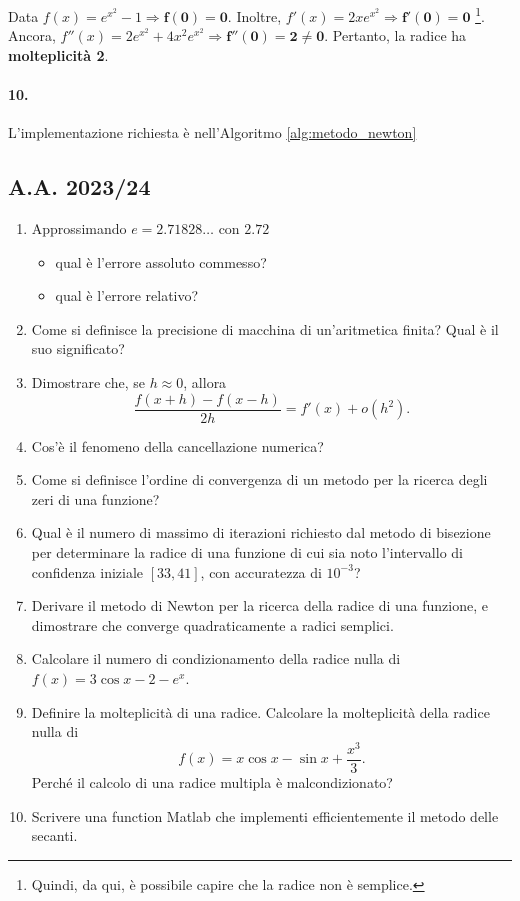\noindent Data $f(x)=e^{x^2}-1\Rightarrow\boldsymbol{f(0)=0}$. Inoltre, $f'(x)=2xe^{x^2}\Rightarrow\boldsymbol{f'(0)=0}$ \footnote{Quindi, da qui, è possibile capire che la radice non è semplice.}. Ancora, $f''(x)=2e^{x^2}+4x^2e^{x^2}\Rightarrow\boldsymbol{f''(0)=2\neq 0}.$ Pertanto, la radice ha \textbf{molteplicità 2}.

\paragraph{10.} L'implementazione richiesta è nell'Algoritmo \ref{alg:metodo_newton}

\subsection{A.A. 2023/24}
\begin{enumerate}
	\item Approssimando $e=2.71828\hdots$ con $2.72$
	\begin{itemize}
		\item qual è l'errore assoluto commesso?
		\item qual è l'errore relativo?
	\end{itemize}
	\item Come si definisce la precisione di macchina di un'aritmetica finita? Qual è il suo significato?
	\item Dimostrare che, se $h\approx 0$, allora
	\begin{equation*}
		\frac{f(x+h)-f(x-h)}{2h}=f'(x)+o(h^2).
	\end{equation*}
	\item Cos'è il fenomeno della cancellazione numerica?
	\item Come si definisce l'ordine di convergenza di un metodo per la ricerca degli zeri di una funzione?
	\item Qual è il numero di massimo di iterazioni richiesto dal metodo di bisezione per determinare la radice di una funzione di cui sia noto l'intervallo di confidenza iniziale $[33,41]$, con accuratezza di $10^{-3}$?
	\item Derivare il metodo di Newton per la ricerca della radice di una funzione, e dimostrare che converge quadraticamente a radici semplici.
	\item Calcolare il numero di condizionamento della radice nulla di $f(x)=3\cos x-2-e^x$.
	\item Definire la molteplicità di una radice. Calcolare la molteplicità della radice nulla di
	\begin{equation*}
		f(x)=x\cos x - \sin x + \frac{x^3}{3}.
	\end{equation*}
	Perché il calcolo di una radice multipla è malcondizionato?
	\item Scrivere una function Matlab che implementi efficientemente il metodo	delle secanti.
\end{enumerate}

